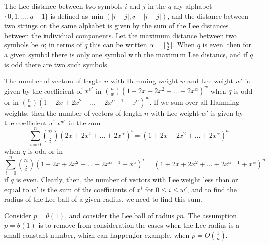 \documentclass[a4paper,12pt]{article}
\date{November 2018}
\begin{document}
The Lee distance between two symbols $i$ and $j$ in the $q$-ary alphabet $\{0, 1, \ldots, q-1\}$ is defined as $\min(\lvert i-j \rvert, q - \lvert i - j \rvert)$, and the distance between two strings on the same alphabet is given by the sum of the Lee distances between the individual components. Let the maximum distance between two symbols be $\alpha$; in terms of $q$ this can be written $\alpha = \lfloor \frac{q}{2}\rfloor$. When $q$ is even, then for a given symbol there is only one symbol with the maximum Lee distance, and if $q$ is  odd there are two such symbols. 

The number of vectors of length $n$ with Hamming weight $w$ and Lee weight $w'$ is given by the coefficient of $x^{w'}$ in $\binom{n}{w}(1 + 2x + 2x^2 +\ldots + 2x^\alpha)^w$ when $q$ is odd or in $\binom{n}{w}(1 + 2x + 2x^2 +\ldots + 2x^{\alpha-1} + x^\alpha)^w$. If we sum over all Hamming weights, then the number of vectors of length $n$ with Lee weight $w'$ is given by the coefficient of $x^{w'}$ in the sum 
\begin{equation}\label{q-odd generating equation}
\sum_{i = 0}^{n} \binom{n}{i}(2x + 2x^2 +\ldots + 2x^\alpha)^i = (1 + 2x + 2x^2 +\ldots + 2x^\alpha)^n
\end{equation}
when $q$ is odd or in 
\begin{equation}\label{q-even generating equation}
\sum_{i = 0}^{n} \binom{n}{i}(1 + 2x + 2x^2 +\ldots + 2x^{\alpha - 1} + x^\alpha)^i = (1 + 2x + 2x^2 +\ldots + 2x^{\alpha-1} +x^\alpha)^n
\end{equation}
if $q$ is even. Clearly, then, the number of vectors with Lee weight less than or equal to $w'$ is the sum of the coefficients of $x^i$ for $0\leq i \leq w'$, and to find the radius of the Lee ball of a given radius, we need to find this sum. 

Consider $p = \theta(1)$, and consider the Lee ball of radius $pn$. The assumption $p = \theta(1)$ is to remove from consideration the cases when the Lee radius is a small constant number, which can happen,for example, when $p = O(\frac{1}{n})$.

\medskip
\end{document}
